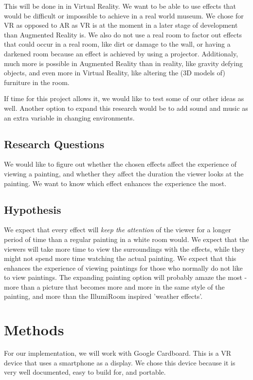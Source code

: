 \documentclass[a4paper]{article}
\begin{document}
This will be done in in Virtual Reality. We want to be able to use effects that would be difficult or impossible to achieve in a real world museum. We chose for VR as opposed to AR as VR is at the moment in a later stage of development than Augmented Reality is. We also do not use a real room to factor out effects that could occur in a real room, like dirt or damage to the wall, or having a darkened room because an effect is achieved by using a projector. Additionaly, much more is possible in Augmented Reality than in reality, like gravity defying objects, and even more in Virtual Reality, like altering the (3D models of) furniture in the room.

If time for this project allows it, we would like to test some of our other ideas as well. Another option to expand this research would be to add sound and music as an extra variable in changing environments.

\subsection {Research Questions}
We would like to figure out whether the chosen effects affect the experience of viewing a painting, and whether they affect the duration the viewer looks at the painting. We want to know which effect enhances the experience the most.

\subsection {Hypothesis}
We expect that every effect will \emph{keep the attention} of the viewer for a longer period of time than a regular painting in a white room would. We expect that the viewers will take more time to view the surroundings with the effects, while they might not spend more time watching the actual painting. We expect that this enhances the experience of viewing paintings for those who normally do not like to view paintings. The expanding painting option will probably amaze the most - more than a picture that becomes more and more in the same style of the painting, and more than the IllumiRoom inspired 'weather effects'.

\section{Methods} \label{sec:methods}

For our implementation, we will work with Google Cardboard. This is a VR device that uses a smartphone as a display. We chose this device because it is very well documented, easy to build for, and portable.
\end{document}
